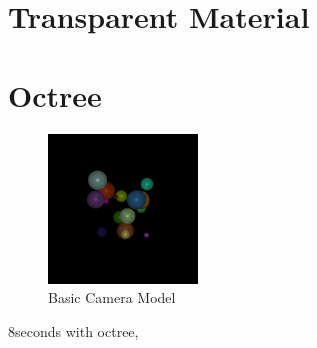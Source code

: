 \documentclass{article}
\begin{document}
\section{Transparent Material}

\section{Octree}

\begin{figure}[H]
  \begin{center}
  \includegraphics[width=150px]{Images/octreeTest.png}
  \caption{Basic Camera Model}
  \label{fig:basiccammod}
  \end{center}
\end{figure}

8seconds with octree, 



\end{document}
